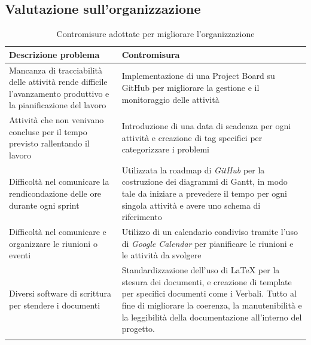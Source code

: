 \documentclass{article}
\begin{document}
\subsection{Valutazione sull'organizzazione}
\begin{center}
\begin{longtable}{|>{\centering\arraybackslash}p{}|>{\centering\arraybackslash}p{}|}
    \hline
    \textbf{Descrizione problema} & \textbf{Contromisura} \\
    \hline
    Mancanza di tracciabilità delle attività rende difficile l'avanzamento produttivo e la pianificazione del lavoro & Implementazione di una Project Board su GitHub per migliorare la gestione e il monitoraggio delle attività \\
    \hline
    Attività che non venivano concluse per il tempo previsto rallentando il lavoro & Introduzione di una data di scadenza per ogni attività e creazione di tag specifici per categorizzare i problemi \\ 
    \hline
    Difficoltà nel comunicare la rendicondazione delle ore durante ogni sprint & Utilizzata la roadmap di \textit{GitHub} per la costruzione dei diagrammi di Gantt, in modo tale da iniziare a prevedere il tempo per ogni singola attività e avere uno schema di riferimento \\
    \hline
    Difficoltà nel comunicare e organizzare le riunioni o eventi & Utilizzo di un calendario condiviso tramite l'uso di \textit{Google Calendar} per pianificare le riunioni e le attività da svolgere \\
    \hline
    Diversi software di scrittura per stendere i documenti & Standardizzazione dell'uso di \LaTeX{} per la stesura dei documenti, e creazione di template per specifici documenti come i Verbali. Tutto al fine di migliorare la coerenza, la manutenibilità e la leggibilità della documentazione all'interno del progetto. \\
    \hline
    \caption{Contromisure adottate per migliorare l'organizzazione}
\end{longtable}
\end{center}
\newpage
\end{document}
